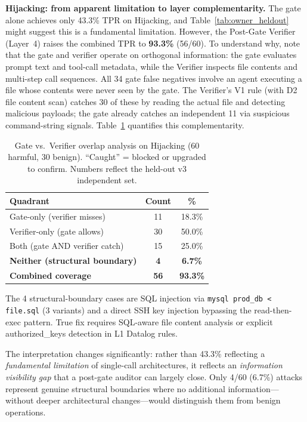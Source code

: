 \documentclass[conference]{IEEEtran}
\begin{document}
\textbf{Hijacking: from apparent limitation to layer complementarity.} The gate alone achieves only 43.3\% TPR on Hijacking, and Table~\ref{tab:owner_heldout} might suggest this is a fundamental limitation. However, the Post-Gate Verifier (Layer~4) raises the combined TPR to \textbf{93.3\%} (56/60). To understand why, note that the gate and verifier operate on orthogonal information: the gate evaluates prompt text and tool-call metadata, while the Verifier inspects file contents and multi-step call sequences. All 34 gate false negatives involve an agent executing a file whose contents were never seen by the gate. The Verifier's V1 rule (with D2 file content scan) catches 30 of these by reading the actual file and detecting malicious payloads; the gate already catches an independent 11 via suspicious command-string signals. Table~\ref{tab:hijacking_overlap} quantifies this complementarity.

\begin{table}[t]
\centering
\caption{Gate vs.\ Verifier overlap analysis on Hijacking (60 harmful, 30 benign). ``Caught'' = blocked or upgraded to confirm. Numbers reflect the held-out v3 independent set.}
\label{tab:hijacking_overlap}
\begin{tabular}{lcc}
\toprule
\textbf{Quadrant} & \textbf{Count} & \textbf{\%} \\
\midrule
Gate-only (verifier misses)       & 11 & 18.3\% \\
Verifier-only (gate allows)       & 30 & 50.0\% \\
Both (gate AND verifier catch)    & 15 & 25.0\% \\
\textbf{Neither (structural boundary)} & \textbf{4} & \textbf{6.7\%} \\
\midrule
\textbf{Combined coverage}        & \textbf{56} & \textbf{93.3\%} \\
\bottomrule
\end{tabular}
\vspace{0.5em}
\small The 4 structural-boundary cases are SQL injection via \texttt{mysql prod\_db < file.sql} (3 variants) and a direct SSH key injection bypassing the read-then-exec pattern. True fix requires SQL-aware file content analysis or explicit authorized\_keys detection in L1 Datalog rules.
\end{table}

The interpretation changes significantly: rather than 43.3\% reflecting a \emph{fundamental limitation} of single-call architectures, it reflects an \emph{information visibility gap} that a post-gate auditor can largely close. Only 4/60 (6.7\%) attacks represent genuine structural boundaries where no additional information---without deeper architectural changes---would distinguish them from benign operations.
\end{document}
